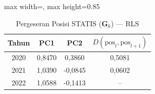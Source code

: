 \begin{table}[H]
\centering
\caption{Pergeseran Posisi STATIS ($\mathbf{G}_k$) --- RLS} \label{tab:sample2jarak_statis_loading_rls}
\begin{adjustbox}{max width=\textwidth, max height=0.85\textheight}
\begin{tabular}{|c|c|c|c|}
\hline
\textbf{Tahun} & \textbf{PC1} & \textbf{PC2} & \textbf{$D(\text{pos}_t, \text{pos}_{t+1})$} \\
\hline
2020 & 0,8470 & 0,3860 & 0,5081 \\
2021 & 1,0390 & -0,0845 & 0,0602 \\
2022 & 1,0588 & -0,1413 & -- \\
\hline
\end{tabular}
\end{adjustbox}
\end{table}